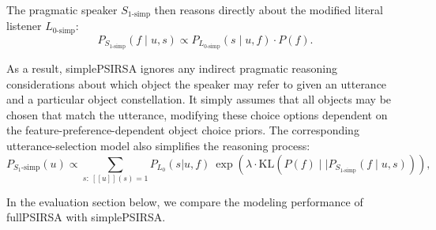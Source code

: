 \documentclass[10pt,a4paper]{article}
\begin{document}
The pragmatic speaker $S_{1\textrm{-simp}}$ then reasons directly about the modified literal listener $L_{0\textrm{-simp}}$: 
\begin{equation}
P_{S_{1\textrm{-simp}}}(f\mid u,s) \propto P_{L_{0\textrm{-simp}}}(s\mid u,f) \cdot P(f).
\end{equation}

As a result, simplePSIRSA ignores any indirect pragmatic reasoning considerations about which object the speaker may refer to given an utterance and a particular object constellation.
It simply assumes that all objects may be chosen that match the utterance, modifying these choice options dependent on the feature-preference-dependent object choice priors. The corresponding utterance-selection model also simplifies the reasoning process:
\begin{equation}
P_{S_1\textrm{-simp}}(u) \propto \sum_{s:\  [\![u]\!](s)=1} P_{L_0}(s|u,f)\ \exp(\lambda \cdot \textrm{KL}(P(f)\mid\mid P_{S_{1\textrm{-simp}}}(f\mid u,s))),
\label{eq:kldivlambdasimp}
\end{equation}

In the evaluation section below, we compare the modeling performance of fullPSIRSA with simplePSIRSA. 




\end{document}
